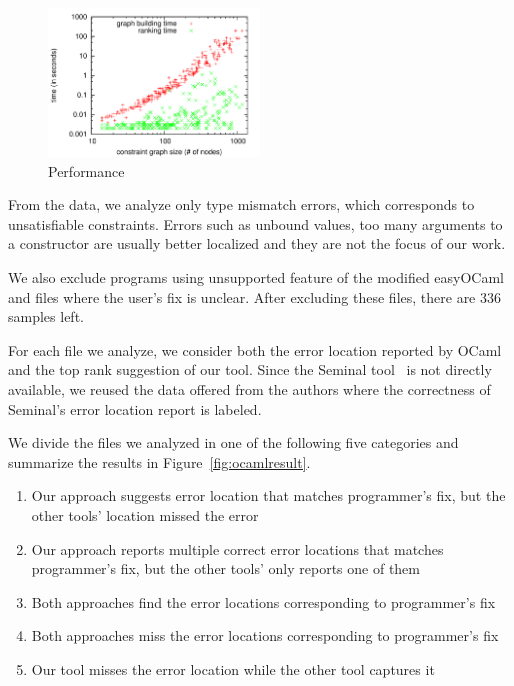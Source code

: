 \begin{figure}
\begin{center}
\includegraphics[width=0.5\textwidth]{graph/ocaml-performance}
\end{center}
\caption{Performance} 
\label{fig:performance}
\end{figure}

From the data, we analyze only type mismatch errors, which corresponds
to unsatisfiable constraints. Errors such as unbound values, too many
arguments to a constructor are usually better localized and they are
not the focus of our work. 

We also exclude programs using unsupported feature of the modified
easyOCaml and files where the user's fix is unclear. After excluding
these files, there are 336 samples left.

For each file we analyze, we consider both the error location reported
by OCaml and the top rank suggestion of our tool. Since the Seminal
tool~\cite{lerner:pldi07} is not directly available, we reused the data
offered from the authors where the correctness of Seminal's error
location report is labeled. 

We divide the files we analyzed in one of the following five
categories and summarize the results in Figure~\ref{fig:ocamlresult}.

\begin{enumerate}
\item Our approach suggests error location that matches programmer's
fix, but the other tools' location missed the error

\item Our approach reports multiple correct error locations that
matches programmer's fix, but the other tools' only reports one of
them 

\item Both approaches find the error locations corresponding to
programmer's fix

\item Both approaches miss the error locations corresponding to
programmer's fix

\item Our tool misses the error location while the other tool captures
it
\end{enumerate}

